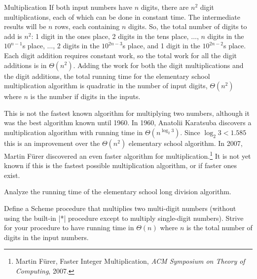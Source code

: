 \begin{schemeregion}
\begin{examplenobar}{Multiplication}
If both input numbers have $n$ digits, there are $n^2$ digit multiplications, each of which can be done in constant time.  
The intermediate results will be $n$ rows, each containing $n$ digits.  So, the total number of digits to add is $n^2$: 1 digit in the ones place, 2 digits in the tens place, $\ldots$, $n$ digits in the $10^{n-1}$s place, $\ldots$, 2 digits in the $10^{2n-3}$s place, and 1 digit in the $10^{2n-2}$s place.  Each digit addition requires constant work, so the total work for all the digit additions is in $\Theta(n^2)$.  Adding the work for both the digit multiplications and the digit additions, the total running time for the elementary school multiplication algorithm is quadratic in the number of input digits, $\Theta(n^2)$ where $n$ is the number if digits in the inputs.

This is not the fastest known algorithm for multiplying two numbers, although it was the best algorithm known until 1960.  In 1960, Anatolii Karatsuba discovers a multiplication algorithm with running time in $\Theta(n^{\log_2 3})$.  Since $\log_2 3 < 1.585$ this is an improvement over the $\Theta(n^2)$ elementary school algorithm.  In 2007, Martin F\"{u}rer discovered an even faster algorithm for multiplication.\footnote{Martin F\"{u}rer, Faster Integer Multiplication, \emph{ACM Symposium on Theory of Computing}, 2007.}  It is not yet known if this is the fastest possible multiplication algorithm, or if faster ones exist. 
 
\end{examplenobar}

\beforeex
\begin{exercise}
\goldstar Analyze the running time of the elementary school long division algorithm.
\solution{\LATER{}}
\end{exercise}
\afterex

\beforeex
\begin{exercise}
\goldstar
Define a Scheme procedure that multiplies two multi-digit numbers (without using the built-in \scheme|*| procedure except to multiply single-digit numbers).  Strive for your procedure to have running time in $\Theta(n)$ where $n$ is the total number of digits in the input numbers.
\solution{\LATER{}}
\end{exercise}
\afterex


\end{schemeregion}

